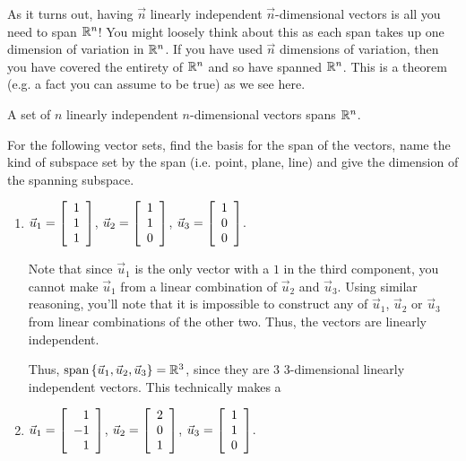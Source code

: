 \documentclass{ximera}
\begin{document}
As it turns out, having $\vec{n}$ linearly independent $\vec{n}$-dimensional vectors is all you need to span $\RR^n$! You might loosely think about this as each span takes up one dimension of variation in $\RR^n$. If you have used $\vec{n}$ dimensions of variation, then you have covered the entirety of $\RR^n$ and so have spanned $\RR^n$. This is a theorem (e.g. a fact you can assume to be true) as we see here.

\begin{theorem}
  A set of $n$ linearly independent $n$-dimensional vectors spans $\RR^n$.
\end{theorem}

\begin{example}

  For the following vector sets, find the basis for the span of the vectors, name the kind of subspace set by the span (i.e. point, plane, line) and give the dimension of the spanning subspace.

  \begin{enumerate}

    \item $\vect{u}_1=\startmat{r} 1 \\ 1 \\ 1 \stopmat$, $\vect{u}_2=\startmat{r} 1 \\ 1 \\ 0 \stopmat$, $\vect{u}_3=\startmat{r} 1 \\ 0 \\ 0 \stopmat$.
    
    \begin{solution}
    
      Note that since $\vec{u}_1$ is the only vector with a $1$ in the third component, you cannot make $\vec{u}_1$ from a linear combination of $\vec{u}_2$ and $\vec{u}_3$. Using similar reasoning, you'll note that it is impossible to construct any of $\vec{u}_1$, $\vec{u}_2$ or $\vec{u}_3$ from linear combinations of the other two. Thus, the vectors are linearly independent. 
      
      Thus, $\sspan\set{\vect{u}_1,\vect{u}_2,\vec{u}_3}=\R^3$, since they are 3 $3$-dimensional linearly independent vectors. This technically makes a 

    \end{solution}

    \item $\vect{u}_1=\startmat{r} 1 \\ -1 \\ 1 \stopmat$, $\vect{u}_2=\startmat{r} 2 \\ 0 \\ 1 \stopmat$, $\vect{u}_3=\startmat{r} 1 \\ 1 \\ 0 \stopmat$.
    

\end{enumerate}
\end{example}
\end{document}
